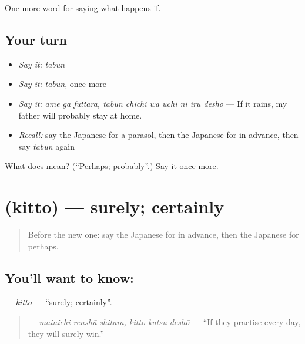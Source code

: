 \begin{grammarlens}[title={What you've built}]
One more word for saying what happens if.
\end{grammarlens}

\subsection*{Your turn}
\begin{itemize}
\raggedright
  \item \emph{Say it:} \emph{tabun}
  \item \emph{Say it:} \emph{tabun}, once more
  \item \emph{Say it:} \emph{ame ga futtara, tabun chichi wa uchi ni iru deshō} — If it rains, my father will probably stay at home.
  \item \emph{Recall:} say the Japanese for a parasol, then the Japanese for in advance, then say \emph{tabun} again
\end{itemize}

\begin{tcolorbox}[breakable,colback=teal!4,colframe=teal!35!black,title={Before you move on}]
What does  mean? (\textquotedblleft{}Perhaps; probably\textquotedblright{}.) Say it once more.
\end{tcolorbox}
\section[\texorpdfstring{\ja{きっと} (kitto)}{きっと (kitto)}]{ (kitto) — surely; certainly}

\label{lesson:JA-C355-kitto}



\begin{quote}
Before the new one: say the Japanese for in advance, then the Japanese for perhaps.
\end{quote}

\subsection*{You'll want to know: }
\textbf{} — \emph{kitto} — \textquotedblleft{}surely; certainly\textquotedblright{}.

\begin{quote}
\textbf{  } — \emph{mainichi renshū shitara, kitto katsu deshō} — \textquotedblleft{}If they practise every day, they will surely win.\textquotedblright{}
\end{quote}

